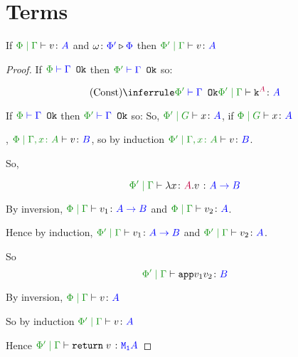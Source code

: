 \documentclass{report}
\begin{document}
\section{Terms}


\begin{theorem}
    If $\gpetyperelation{v}{A}$ and $\omega \colon {\color{blue}\Phi'} \triangleright {\color {blue} \Phi}$ then $\etyperelation{\P'}{\G}{v}{A}$
\end{theorem}



\begin{framed}
    \begin{proof}
            \case{\vconst}
            If $\wellformedok{\P}{\G}$ then $\wellformedok{\P'}{\G}$ so:
        
            \begin{equation}
                \ntreeruleI{\vconst}{\wellformedok{\P'}{\G}}{\etyperelation{\P'}{\G}{\const{A}}{A}}
            \end{equation}
        
            If $\wellformedok{\P}{\G}$ then $\wellformedok{\P'}{\G}$ so:
            So, $\etyperelation{\P'}{G}{x}{A}$, if $\etyperelation{\P}{G}{x}{A}$

            \case{\vfun}
            \bi, $\etyperelation{\P}{\gax}{v}{B}$, so by induction $\etyperelation{\P'}{\gax}{v}{B}$.
        
            So,
        
            \begin{equation}
                \etyperelation{\P'}{\G}{\lam{x}{A}{v}}{\ab}
            \end{equation}
        
            \case{\vapply}
            By inversion,  $\gpetyperelation{v_1}{\ab}$ and $\gpetyperelation{v_2}{A}$.
        
            Hence by induction,
            $\gppetyperelation{v_1}{\ab}$ and $\gppetyperelation{v_2}{A}$.
        
            So $$\gppetyperelation{\app{v_1}{v_2}}{B}$$
        
            \case{\vreturn}
        
            By inversion,  $\gpetyperelation{v}{A}$ 
            
            So by induction $\gppetyperelation{v}{A}$
        
            Hence $\gppetyperelation{\return{v}}{\moa}$
        

\end{proof}
\end{framed}
\end{document}
